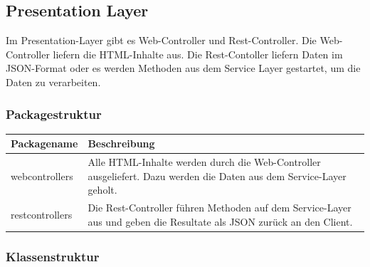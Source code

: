 \newpage

\subsection{Presentation Layer}


Im Presentation-Layer gibt es Web-Controller und Rest-Controller. Die Web-Controller liefern die HTML-Inhalte aus. Die Rest-Contoller liefern Daten im JSON-Format oder es werden Methoden aus dem Service Layer gestartet, um die Daten zu verarbeiten.


\subsubsection{Packagestruktur}


\begin{table}[H]
\centering
    \begin{tabular}{@{}l p{11.9cm} @{}}\toprule    
    {Packagename} & {Beschreibung}\\ \midrule
    webcontrollers & Alle HTML-Inhalte werden durch die Web-Controller ausgeliefert. Dazu werden die Daten aus dem Service-Layer geholt.\\       
    restcontrollers & Die Rest-Controller führen Methoden auf dem Service-Layer aus und geben die Resultate als JSON zurück an den Client. \\
    \bottomrule
    \end{tabular}
\end{table}

\subsubsection{Klassenstruktur}

